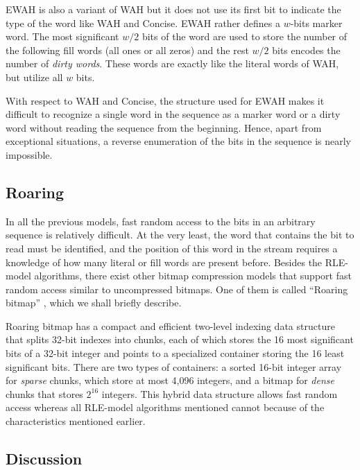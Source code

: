 EWAH \cite{lemire2010} is also a variant of WAH but it does not use its first bit to indicate the type of the word like WAH and Concise. EWAH rather defines a $w$-bits marker word. The most significant $w/2$ bits of the word are used to store the number of the following fill words (all ones or all zeros) and the rest $w/2$ bits encodes the number of \emph{dirty words}. These words are exactly like the literal words of WAH, but utilize all $w$ bits. 

With respect to WAH and Concise, the structure used for EWAH makes it difficult to recognize a single word in the sequence as a marker word or a dirty word without reading the sequence from the beginning. Hence, apart from exceptional situations, a reverse enumeration of the bits in the sequence is nearly impossible.

\subsection{Roaring}

In all the previous models, fast random access to the bits in an arbitrary sequence is relatively difficult. At the very least, the word that contains the bit to read must be identified, and the position of this word in the stream requires a knowledge of how many literal or fill words are present before. Besides the RLE-model algorithms, there exist other bitmap compression models that support fast random access similar to uncompressed bitmaps. One of them is called ``Roaring bitmap'' \cite{lemire2015}, which we shall briefly describe.

Roaring bitmap has a compact and efficient two-level indexing data structure that splits 32-bit indexes into chunks, each of which stores the 16 most significant bits of a 32-bit integer and points to a specialized container storing the 16 least significant bits. There are two types of containers: a sorted 16-bit integer array for \emph{sparse} chunks, which store at most 4,096 integers, and a bitmap for \emph{dense} chunks that stores $2^{16}$ integers. This hybrid data structure allows fast random access whereas all RLE-model algorithms mentioned cannot because of the characteristics mentioned earlier.


\subsection{Discussion}

